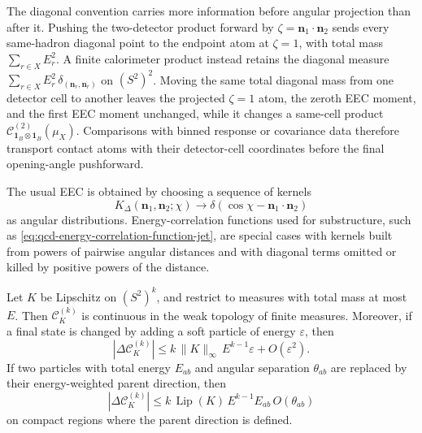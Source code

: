 The diagonal convention carries more information before angular projection
than after it.  Pushing the two-detector product forward by
\(\zeta=\mathbf n_1\cdot\mathbf n_2\) sends every same-hadron diagonal point
to the endpoint atom at \(\zeta=1\), with total mass
\(\sum_{r\in X}E_r^2\).  A finite calorimeter product instead retains the
diagonal measure \(\sum_{r\in X}E_r^2\,
\delta_{(\mathbf n_r,\mathbf n_r)}\) on \((S^2)^2\).  Moving the same total
diagonal mass from one detector cell to another leaves the projected
\(\zeta=1\) atom, the zeroth EEC moment, and the first EEC moment unchanged,
while it changes a same-cell product
\(\mathcal C^{(2)}_{\mathbf 1_B\otimes \mathbf 1_B}(\mu_X)\).  Comparisons
with binned response or covariance data therefore transport contact atoms
with their detector-cell coordinates before the final opening-angle
pushforward.

The usual EEC is obtained by choosing a sequence of kernels
\[
  K_\Delta(\mathbf n_1,\mathbf n_2;\chi)
  \longrightarrow
  \delta(\cos\chi-\mathbf n_1\cdot\mathbf n_2)
\]
as angular distributions.  Energy-correlation functions used for
substructure, such as \eqref{eq:qcd-energy-correlation-function-jet}, are
special cases with kernels built from powers of pairwise angular distances
and with diagonal terms omitted or killed by positive powers of the
distance.

\begin{lemma}
\label{lem:smeared-energy-correlator-continuity}
Let \(K\) be Lipschitz on \((S^2)^k\), and restrict to measures with total
mass at most \(E\).  Then \(\mathcal C_K^{(k)}\) is continuous in the
weak topology of finite measures.  Moreover, if a final state is changed by
adding a soft particle of energy \(\varepsilon\), then
\begin{equation}
  |\Delta\mathcal C_K^{(k)}|
  \le
  k\,\|K\|_\infty\,E^{k-1}\varepsilon
  +O(\varepsilon^2).
  \label{eq:energy-correlator-soft-bound}
\end{equation}
If two particles with total energy \(E_{ab}\) and angular separation
\(\theta_{ab}\) are replaced by their energy-weighted parent direction, then
\begin{equation}
  |\Delta\mathcal C_K^{(k)}|
  \le
  k\,\operatorname{Lip}(K)\,E^{k-1}E_{ab}\,O(\theta_{ab})
  \label{eq:energy-correlator-collinear-bound}
\end{equation}
on compact regions where the parent direction is defined.
\end{lemma}

